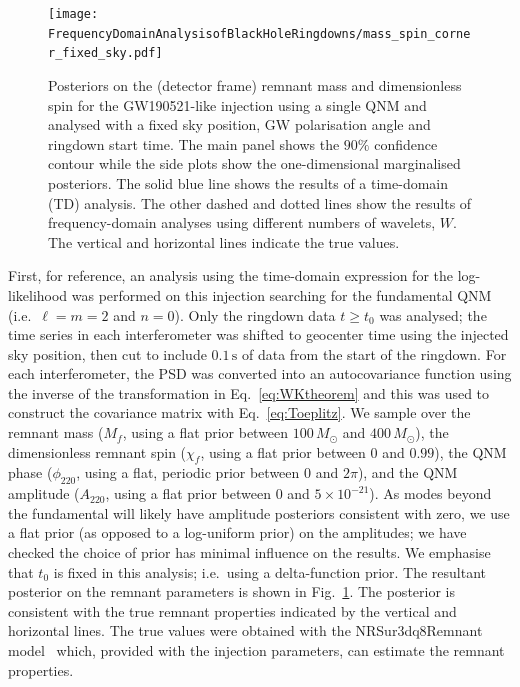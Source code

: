 \begin{figure}[t!]
    \centering
    \texttt{[image: FrequencyDomainAnalysisofBlackHoleRingdowns/mass\_spin\_corner\_fixed\_sky.pdf]}
    \caption[Posteriors on the remnant mass and spin for a GW190521-like injection analysed with a fixed sky location and ringdown start time, for different numbers of wavelets]{ 
    Posteriors on the (detector frame) remnant mass and dimensionless spin for the GW190521-like injection using a single QNM and analysed with a fixed sky position, GW polarisation angle and ringdown start time.
    The main panel shows the $90\%$ confidence contour while the side plots show the one-dimensional marginalised posteriors.
    The solid blue line shows the results of a time-domain (TD) analysis.
    The other dashed and dotted lines show the results of frequency-domain analyses using different numbers of wavelets, $W$.
    The vertical and horizontal lines indicate the true values.
    }
    \label{fig:mass_spin_corner_fixed_sky}
\end{figure}

First, for reference, an analysis using the time-domain expression for the log-likelihood was performed on this injection searching for the fundamental QNM (i.e.\ $\ell = m = 2$ and $n=0$).
Only the ringdown data $t\geq t_0$ was analysed; the time series in each interferometer was shifted to geocenter time using the injected sky position, then cut to include $0.1\,\mathrm{s}$ of data from the start of the ringdown.
For each interferometer, the PSD was converted into an autocovariance function using the inverse of the transformation in Eq.~\ref{eq:WKtheorem} and this was used to construct the covariance matrix with Eq.~\ref{eq:Toeplitz}.
We sample over the remnant mass ($M_f$, using a flat prior between $100\,M_\odot$ and $400\,M_\odot$), the dimensionless remnant spin ($\chi_f$, using a flat prior between $0$ and $0.99$), the QNM phase ($\phi_{220}$, using a flat, periodic prior between $0$ and $2\pi$), and the QNM amplitude ($A_{220}$, using a flat prior between 0 and $5 \times 10^{-21}$).
As modes beyond the fundamental will likely have amplitude posteriors consistent with zero, we use a flat prior (as opposed to a log-uniform prior) on the amplitudes; we have checked the choice of prior has minimal influence on the results.
We emphasise that $t_0$ is fixed in this analysis; i.e.\ using a delta-function prior.
The resultant posterior on the remnant parameters is shown in Fig.~\ref{fig:mass_spin_corner_fixed_sky}.
The posterior is consistent with the true remnant properties indicated by the vertical and horizontal lines. 
The true values were obtained with the NRSur3dq8Remnant model~\cite{Varma:2018aht} which, provided with the injection parameters, can estimate the remnant properties.

